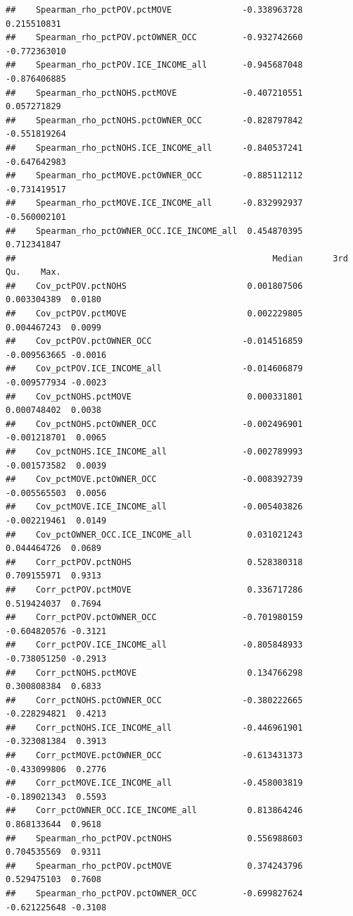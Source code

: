 \documentclass[
]{book}
\begin{document}
\begin{verbatim}
##    Spearman_rho_pctPOV.pctMOVE              -0.338963728  0.215510831
##    Spearman_rho_pctPOV.pctOWNER_OCC         -0.932742660 -0.772363010
##    Spearman_rho_pctPOV.ICE_INCOME_all       -0.945687048 -0.876406885
##    Spearman_rho_pctNOHS.pctMOVE             -0.407210551  0.057271829
##    Spearman_rho_pctNOHS.pctOWNER_OCC        -0.828797842 -0.551819264
##    Spearman_rho_pctNOHS.ICE_INCOME_all      -0.840537241 -0.647642983
##    Spearman_rho_pctMOVE.pctOWNER_OCC        -0.885112112 -0.731419517
##    Spearman_rho_pctMOVE.ICE_INCOME_all      -0.832992937 -0.560002101
##    Spearman_rho_pctOWNER_OCC.ICE_INCOME_all  0.454870395  0.712341847
##                                                   Median      3rd Qu.    Max.
##    Cov_pctPOV.pctNOHS                        0.001807506  0.003304389  0.0180
##    Cov_pctPOV.pctMOVE                        0.002229805  0.004467243  0.0099
##    Cov_pctPOV.pctOWNER_OCC                  -0.014516859 -0.009563665 -0.0016
##    Cov_pctPOV.ICE_INCOME_all                -0.014606879 -0.009577934 -0.0023
##    Cov_pctNOHS.pctMOVE                       0.000331801  0.000748402  0.0038
##    Cov_pctNOHS.pctOWNER_OCC                 -0.002496901 -0.001218701  0.0065
##    Cov_pctNOHS.ICE_INCOME_all               -0.002789993 -0.001573582  0.0039
##    Cov_pctMOVE.pctOWNER_OCC                 -0.008392739 -0.005565503  0.0056
##    Cov_pctMOVE.ICE_INCOME_all               -0.005403826 -0.002219461  0.0149
##    Cov_pctOWNER_OCC.ICE_INCOME_all           0.031021243  0.044464726  0.0689
##    Corr_pctPOV.pctNOHS                       0.528380318  0.709155971  0.9313
##    Corr_pctPOV.pctMOVE                       0.336717286  0.519424037  0.7694
##    Corr_pctPOV.pctOWNER_OCC                 -0.701980159 -0.604820576 -0.3121
##    Corr_pctPOV.ICE_INCOME_all               -0.805848933 -0.738051250 -0.2913
##    Corr_pctNOHS.pctMOVE                      0.134766298  0.300808384  0.6833
##    Corr_pctNOHS.pctOWNER_OCC                -0.380222665 -0.228294821  0.4213
##    Corr_pctNOHS.ICE_INCOME_all              -0.446961901 -0.323081384  0.3913
##    Corr_pctMOVE.pctOWNER_OCC                -0.613431373 -0.433099806  0.2776
##    Corr_pctMOVE.ICE_INCOME_all              -0.458003819 -0.189021343  0.5593
##    Corr_pctOWNER_OCC.ICE_INCOME_all          0.813864246  0.868133644  0.9618
##    Spearman_rho_pctPOV.pctNOHS               0.556988603  0.704535569  0.9311
##    Spearman_rho_pctPOV.pctMOVE               0.374243796  0.529475103  0.7608
##    Spearman_rho_pctPOV.pctOWNER_OCC         -0.699827624 -0.621225648 -0.3108

\end{verbatim}
\end{document}
